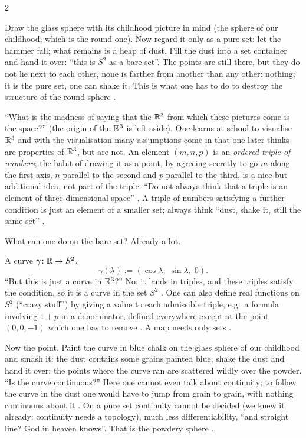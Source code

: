 \begin{paracol}{2}
\begin{aside}
Draw the glass sphere with its childhood picture in mind (the sphere of our childhood, which is the round one). Now regard it
only as a pure set: let the hammer fall; what remains is a heap of dust. Fill the dust into a set container and hand
it over: ``this is $S^2$ as a bare set''. The points are still there, but they do not lie next to each other, none is
farther from another than any other: nothing; it is the pure set, one can shake it. This is what one has to do to destroy the
structure of the round sphere .
\end{aside}
\begin{coursenote}
``What is the madness of saying that the $\mathbb{R}^3$ from which these pictures come is the space?'' (the origin of the $\mathbb{R}^3$ is
left aside). One learns at school to visualise $\mathbb{R}^3$ and with the visualisation many assumptions come in that one later thinks are
properties of $\mathbb{R}^3$, but are not. An element $(m,n,p)$ is an \emph{ordered triple of numbers}; the habit of drawing it as a point,
by agreeing secretly to go $m$ along the first axis, $n$ parallel to the second and $p$ parallel to the third, is a nice but
additional idea, not part of the triple. ``Do not always think that a triple is an element of three-dimensional space''
. A triple of numbers satisfying a further condition is just an element of a smaller set; always think ``dust, shake
it, still the same set'' .
\end{coursenote}

What can one do on the bare set? Already a lot.
\begin{example}\label{ex:sp-curve}
A curve $\gamma\colon\mathbb{R}\to S^2$,
\[
  \gamma(\lambda):=(\cos\lambda,\;\sin\lambda,\;0).
\]
``But this is just a curve in $\mathbb{R}^3$?'' No: it lands in triples, and these triples satisfy the condition, so it is a curve in the
set $S^2$ . One can also define real functions on $S^2$ (``crazy stuff'') by giving a value to each admissible triple,
e.g.\ a formula involving $1+p$ in a denominator, defined everywhere except at the point $(0,0,-1)$ which one has to remove
. A map needs only sets .
\end{example}
Now the point. Paint the curve in blue chalk on the glass sphere of our childhood and smash it: the dust contains some grains painted
blue; shake the dust and hand it over: the points where the curve ran are scattered wildly over the powder. ``Is the curve
continuous?'' Here one cannot even talk about continuity; to follow the curve in the dust one would have to jump from grain to grain, with
nothing continuous about it . On a pure set continuity cannot be decided (we knew it already: continuity needs a topology),
much less differentiability, ``and straight line? God in heaven knows''. That is the powdery sphere .


\end{paracol}
